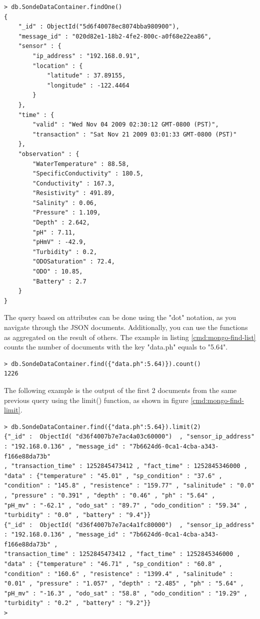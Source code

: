 \lstset{label=cmd:mongo-findone,caption=Querying the database: one item}
\begin{lstlisting}
> db.SondeDataContainer.findOne()
{
    "_id" : ObjectId("5d6f40078ec8074bba980900"),
    "message_id" : "020d82e1-18b2-4fe2-800c-a0f68e22ea86",
    "sensor" : {
        "ip_address" : "192.168.0.91",
        "location" : {
            "latitude" : 37.89155,
            "longitude" : -122.4464
        }
    },
    "time" : {
        "valid" : "Wed Nov 04 2009 02:30:12 GMT-0800 (PST)",
        "transaction" : "Sat Nov 21 2009 03:01:33 GMT-0800 (PST)"
    },
    "observation" : {
        "WaterTemperature" : 88.58,
        "SpecificConductivity" : 180.5,
        "Conductivity" : 167.3,
        "Resistivity" : 491.89,
        "Salinity" : 0.06,
        "Pressure" : 1.109,
        "Depth" : 2.642,
        "pH" : 7.11,
        "pHmV" : -42.9,
        "Turbidity" : 0.2,
        "ODOSaturation" : 72.4,
        "ODO" : 10.85,
        "Battery" : 2.7
    }
}
\end{lstlisting}

The query based on attributes can be done using the "dot" notation, as you
navigate through the JSON documents. Additionally, you can use the functions as
aggregated on the result of others. The example in listing
\ref{cmd:mongo-find-list} counts the number of documents with the key
"data.ph" equals to "5.64".

\lstset{label=cmd:mongo-find-list,caption=Execution of mongo client}
\begin{lstlisting}
> db.SondeDataContainer.find({"data.ph":5.64)}).count()
1226
\end{lstlisting}

The following example is the output of the first 2 documents from the same
previous query using the limit() function, as shown in figure
\ref{cmd:mongo-find-limit}.

\lstset{label=cmd:mongo-find-limit,caption=Query Element with specific
projection limiting the result set size}
\begin{lstlisting}
> db.SondeDataContainer.find({"data.ph":5.64}).limit(2)
{"_id" :  ObjectId( "d36f4007b7e7ac4a03c60000")  , "sensor_ip_address" : "192.168.0.136" , "message_id" : "7b6624d6-0ca1-4cba-a343-f166e88da73b"
, "transaction_time" : 1252845473412 , "fact_time" : 1252845346000 , "data" : {"temperature" : "45.01" , "sp_condition" : "37.6" ,
"condition" : "145.8" , "resistence" : "159.77" , "salinitude" : "0.0" , "pressure" : "0.391" , "depth" : "0.46" , "ph" : "5.64" ,
"pH_mv" : "-62.1" , "odo_sat" : "89.7" , "odo_condition" : "59.34" , "turbidity" : "0.0" , "battery" : "9.4"}}
{"_id" :  ObjectId( "d36f4007b7e7ac4a1fc80000")  , "sensor_ip_address" : "192.168.0.136" , "message_id" : "7b6624d6-0ca1-4cba-a343-f166e88da73b" ,
"transaction_time" : 1252845473412 , "fact_time" : 1252845346000 , "data" : {"temperature" : "46.71" , "sp_condition" : "60.8" ,
"condition" : "160.6" , "resistence" : "1399.4" , "salinitude" : "0.01" , "pressure" : "1.057" , "depth" : "2.485" , "ph" : "5.64" ,
"pH_mv" : "-16.3" , "odo_sat" : "58.8" , "odo_condition" : "19.29" , "turbidity" : "0.2" , "battery" : "9.2"}}
>
\end{lstlisting}

